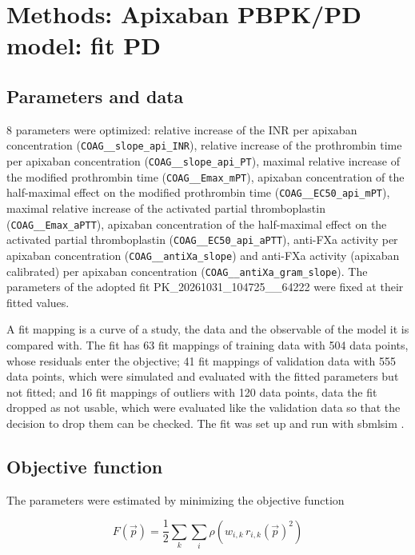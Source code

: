 \section{Methods: Apixaban PBPK/PD model: fit PD}

\subsection{Parameters and data}

8 parameters were optimized: relative increase of the INR per apixaban concentration (\texttt{COAG\_\_slope\_api\_INR}), relative increase of the prothrombin time per apixaban concentration (\texttt{COAG\_\_slope\_api\_PT}), maximal relative increase of the modified prothrombin time (\texttt{COAG\_\_Emax\_mPT}), apixaban concentration of the half-maximal effect on the modified prothrombin time (\texttt{COAG\_\_EC50\_api\_mPT}), maximal relative increase of the activated partial thromboplastin (\texttt{COAG\_\_Emax\_aPTT}), apixaban concentration of the half-maximal effect on the activated partial thromboplastin (\texttt{COAG\_\_EC50\_api\_aPTT}), anti-FXa activity per apixaban concentration (\texttt{COAG\_\_antiXa\_slope}) and anti-FXa activity (apixaban calibrated) per apixaban concentration (\texttt{COAG\_\_antiXa\_gram\_slope}). The parameters of the adopted fit PK\_20261031\_104725\_\_64222 were fixed at their fitted values.

A fit mapping is a curve of a study, the data and the observable of the model it is compared with. The fit has 63 fit mappings of training data with 504 data points, whose residuals enter the objective; 41 fit mappings of validation data with 555 data points, which were simulated and evaluated with the fitted parameters but not fitted; and 16 fit mappings of outliers with 120 data points, data the fit dropped as not usable, which were evaluated like the validation data so that the decision to drop them can be checked. The fit was set up and run with sbmlsim \cite{Koenig2026_sbmlsim}.

\subsection{Objective function}

The parameters were estimated by minimizing the objective function

\begin{equation}
F(\vec{p}) = \frac{1}{2} \sum_{k} \sum_{i} \rho\left(w_{i,k}\, r_{i,k}(\vec{p})^2\right)
\end{equation}

